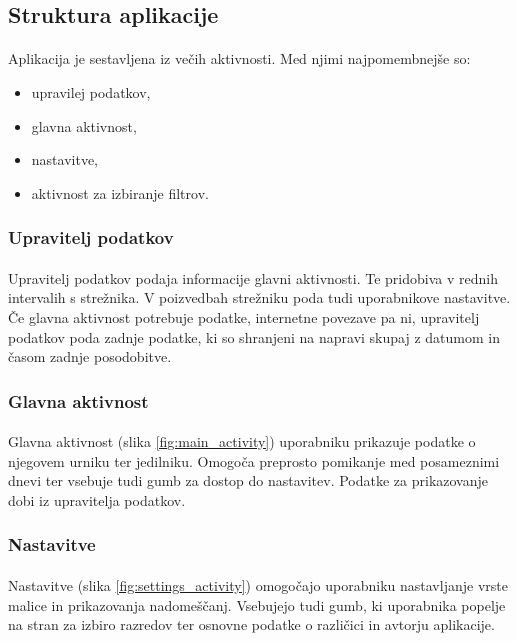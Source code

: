 \subsection{Struktura aplikacije}
\paragraph{}Aplikacija je sestavljena iz večih aktivnosti. Med njimi najpomembnejše so:
\begin{itemize}
  \setlength\itemsep{0em}
  \item upravilej podatkov,
  \item glavna aktivnost,
  \item nastavitve,
  \item aktivnost za izbiranje filtrov.
\end{itemize}

\subsubsection{Upravitelj podatkov}
\paragraph{}Upravitelj podatkov podaja informacije glavni aktivnosti. Te pridobiva v rednih intervalih s strežnika. V poizvedbah strežniku poda tudi uporabnikove nastavitve. Če glavna aktivnost potrebuje podatke, internetne povezave pa ni, upravitelj podatkov poda zadnje podatke, ki so shranjeni na napravi skupaj z datumom in časom zadnje posodobitve.

\subsubsection{Glavna aktivnost}
\paragraph{}Glavna aktivnost (slika \ref{fig:main_activity}) uporabniku prikazuje podatke o njegovem urniku ter jedilniku. Omogoča preprosto pomikanje med posameznimi dnevi ter vsebuje tudi gumb za dostop do nastavitev. Podatke za prikazovanje dobi iz upravitelja podatkov.

\subsubsection{Nastavitve}
\paragraph{}Nastavitve (slika \ref{fig:settings_activity}) omogočajo uporabniku nastavljanje vrste malice in prikazovanja nadomeščanj. Vsebujejo tudi gumb, ki uporabnika popelje na stran za izbiro razredov ter osnovne podatke o različici in avtorju aplikacije.

